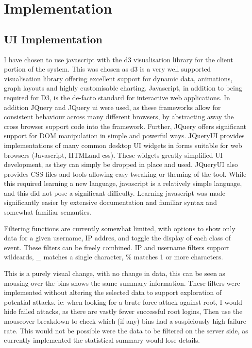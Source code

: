 \chapter{Implementation}\label{C:impl}

\section{UI Implementation}\label{imp_ui} 

I have chosen to use javascript with the d3 visualisation library \cite{bostock2011d3} for the client portion of the system. This was chosen as d3 is a very well supported visualisation library offering excellent support for dynamic data, animations, graph layouts and highly customisable charting. Javascript, in addition to being required for D3, is the de-facto standard for interactive web applications. 
In addition JQuery and JQuery ui were used, as these frameworks allow for consistent behaviour across many different browsers, by abstracting away the cross browser support code into the framework. Further, JQuery offers significant support for DOM manipulation in simple and powerful ways. JQueryUI provides implementations of many common desktop UI widgets in forms suitable for web browsers (Javascript, HTMLand css). These widgets greatly simplified UI development, as they can simply be dropped in place and used. JQueryUI also provides CSS files and tools allowing easy tweaking or theming of the tool.
While this required learning a new language, javascript is a relatively simple language, and this did not pose a significant difficulty. Learning javascript was made significantly easier by extensive documentation and familiar syntax and somewhat familiar semantics. 

Filtering functions are currently somewhat limited, with options to show only data for a given username, IP addres, and toggle the display of each class of event. These filters can be freely combined. IP and username filters support wildcards, \_ matches a single character, \% matches 1 or more characters. 

This is a purely visual change, with no change in data, this can be seen as mousing over the bins shows the same summary information. These filters were implemented without altering the selected data to support exploration of potential attacks. ie: when looking for a brute force attack against root, I would hide failed attacks, as there are vastly fewer successful root logins, Then use the mouseover breakdown to check which (if any) bins had a suspiciously high failure rate. This would not be possible were the data to be filtered on the server side, as currently implemented the statistical summary would lose details.


